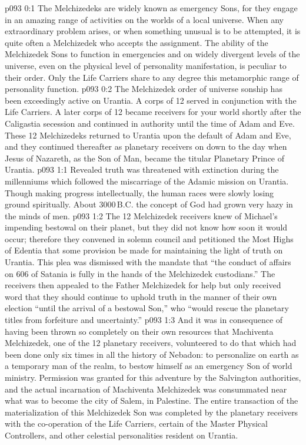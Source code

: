 \author{Melchizedek}
\vs p093 0:1 The Melchizedeks are widely known as emergency Sons, for they engage in an amazing range of activities on the worlds of a local universe. When any extraordinary problem arises, or when something unusual is to be attempted, it is quite often a Melchizedek who accepts the assignment. The ability of the Melchizedek Sons to function in emergencies and on widely divergent levels of the universe, even on the physical level of personality manifestation, is peculiar to their order. Only the Life Carriers share to any degree this metamorphic range of personality function.
\vs p093 0:2 \pc The Melchizedek order of universe sonship has been exceedingly active on Urantia. A corps of 12 served in conjunction with the Life Carriers. A later corps of 12 became receivers for your world shortly after the Caligastia secession and continued in authority until the time of Adam and Eve. These 12 Melchizedeks returned to Urantia upon the default of Adam and Eve, and they continued thereafter as planetary receivers on down to the day when Jesus of Nazareth, as the Son of Man, became the titular Planetary Prince of Urantia.
\vs p093 1:1 Revealed truth was threatened with extinction during the millenniums which followed the miscarriage of the Adamic mission on Urantia. Though making progress intellectually, the human races were slowly losing ground spiritually. About 3000\,B.C. the concept of God had grown very hazy in the minds of men.
\vs p093 1:2 The 12 Melchizedek receivers knew of Michael’s impending bestowal on their planet, but they did not know how soon it would occur; therefore they convened in solemn council and petitioned the Most Highs of Edentia that some provision be made for maintaining the light of truth on Urantia. This plea was dismissed with the mandate that “the conduct of affairs on 606 of Satania is fully in the hands of the Melchizedek custodians.” The receivers then appealed to the Father Melchizedek for help but only received word that they should continue to uphold truth in the manner of their own election “until the arrival of a bestowal Son,” who “would rescue the planetary titles from forfeiture and uncertainty.”
\vs p093 1:3 And it was in consequence of having been thrown so completely on their own resources that Machiventa Melchizedek, one of the 12 planetary receivers, volunteered to do that which had been done only six times in all the history of Nebadon: to personalize on earth as a temporary man of the realm, to bestow himself as an emergency Son of world ministry. Permission was granted for this adventure by the Salvington authorities, and the actual incarnation of Machiventa Melchizedek was consummated near what was to become the city of Salem, in Palestine. The entire transaction of the materialization of this Melchizedek Son was completed by the planetary receivers with the co\hyp{}operation of the Life Carriers, certain of the Master Physical Controllers, and other celestial personalities resident on Urantia.
